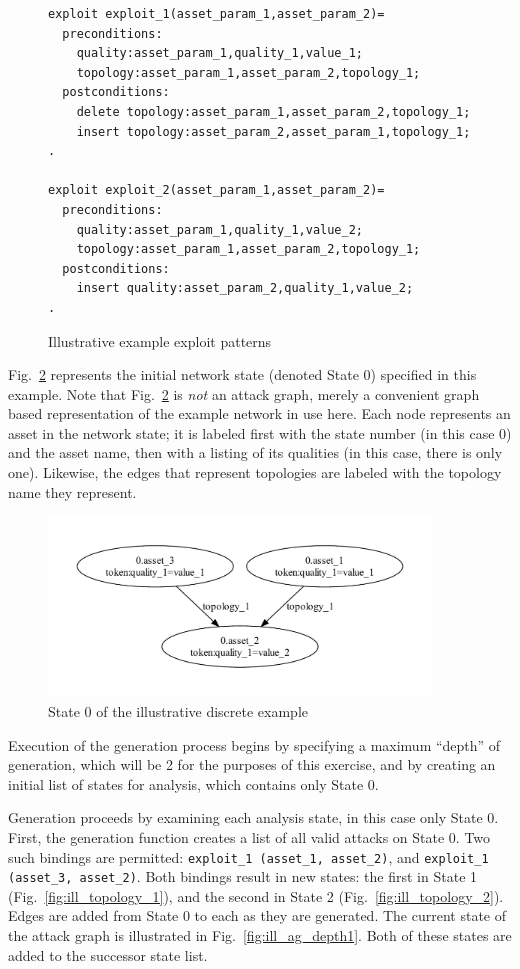 \begin{figure}
\begin{lstlisting}
exploit exploit_1(asset_param_1,asset_param_2)=
  preconditions:
    quality:asset_param_1,quality_1,value_1;
    topology:asset_param_1,asset_param_2,topology_1;
  postconditions:
    delete topology:asset_param_1,asset_param_2,topology_1;
    insert topology:asset_param_2,asset_param_1,topology_1;
.

exploit exploit_2(asset_param_1,asset_param_2)=
  preconditions:
    quality:asset_param_1,quality_1,value_2;
    topology:asset_param_1,asset_param_2,topology_1;
  postconditions:
    insert quality:asset_param_2,quality_1,value_2;
.
\end{lstlisting}
\caption{Illustrative example exploit patterns}
\label{fig:ill_xp}
\end{figure}

Fig.~\ref{fig:ill_topology_0} represents the initial network state 
(denoted State 0) specified
in this example. Note that Fig.~\ref{fig:ill_topology_0} is \emph{not} an attack
graph, merely a convenient graph based representation of the example network
in use here. Each node represents an asset in the network state; it is labeled
first with the state number (in this case 0) and the asset name, then with a
listing of its qualities (in this case, there is only one).
Likewise, the edges that represent topologies
are labeled with the topology name they represent.

\begin{figure}
\includegraphics[width=4in]{ag_illustrative_simple/nm_state0}
\caption{State 0 of the illustrative discrete example}
\label{fig:ill_topology_0}
\end{figure}

Execution of the generation process begins by specifying a maximum ``depth''
of generation, which will be 2 for the purposes of this exercise, and by creating
an initial list of states for analysis, which contains only State 0.

Generation proceeds by examining each analysis state, in this case only State 0.
First, the generation function creates a list of all valid
attacks on State 0. Two such bindings are permitted: \texttt{exploit\_1 (asset\_1, asset\_2)},
and \texttt{exploit\_1 (asset\_3, asset\_2)}. Both bindings result in new states:
the first in State 1 (Fig.~\ref{fig:ill_topology_1}), and the second in State 2
(Fig.~\ref{fig:ill_topology_2}). Edges are added from State 0 to each as they are
generated. The current state of the attack graph is illustrated in 
Fig.~\ref{fig:ill_ag_depth1}. Both of these states are added to the
successor state list.

